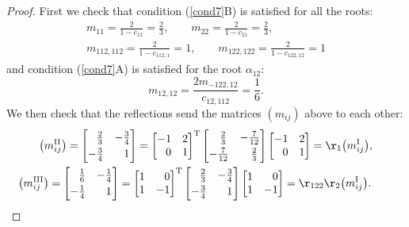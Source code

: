 \documentclass[pdftex]{sigma}%
\numberwithin{equation}{section}
\begin{document}
\begin{proof}
First we check that condition (\ref{cond7}B) is satisfied for all the roots:
\begin{gather*}
m_{11} = \frac{2}{1-c_{12}} = \frac{2}{3}, \qquad
m_{22} = \frac{2}{1-c_{21}} = \frac{2}{3}, \\
m_{112,112} = \frac{2}{1-c_{112,1}} = 1, \qquad
m_{122,122} = \frac{2}{1-c_{122,12}} = 1
\end{gather*}
and condition (\ref{cond7}A) is satisfied for the root $\alpha_{12}$:
\[m_{12,12} = \frac{2m_{-122,12}}{c_{12,112}} = \frac{1}{6}.\]
We then check that the reflections send the matrices $(m_{ij})$ above to each other:
\begin{gather*}
\big(m_{ij}^{\mathrm{II}}\big) =\begin{bmatrix}
 \hphantom{-}\frac{2}{3} & -\frac{3}{4}\vspace{1mm}\\
 -\frac{3}{4} & \hphantom{-}1
\end{bmatrix} =
\begin{bmatrix}
 -1 & 2\\
\hphantom{-}0 & 1
\end{bmatrix}^{\rm T}
\begin{bmatrix}
 \hphantom{-}\frac{2}{3} & -\frac{7}{12}\vspace{1mm}\\
 -\frac{7}{12} & \hphantom{-}\frac{2}{3}
\end{bmatrix}
\begin{bmatrix}
 -1 & 2\\
 \hphantom{-}0 & 1
\end{bmatrix} = \r_1 \big(m_{ij}^{\mathrm{I}}\big),\\
\big(m_{ij}^{\mathrm{III}}\big)=\begin{bmatrix}
 \hphantom{-}\frac{1}{6} & -\frac{1}{4}\vspace{1mm}\\
 -\frac{1}{4} & \hphantom{-}1
\end{bmatrix} =
\begin{bmatrix}
 1 & \hphantom{-}0\\
 1 & -1
\end{bmatrix}^{\rm T}
\begin{bmatrix}
\hphantom{-}\frac{2}{3} & -\frac{3}{4}\vspace{1mm}\\
 -\frac{3}{4} & \hphantom{-}1
\end{bmatrix}
\begin{bmatrix}
 1 & \hphantom{-}0\\
 1 & -1
\end{bmatrix} = \r_{122} \r_2 \big(m_{ij}^{\mathrm{I}}\big).\tag*{\qed}
\end{gather*}\renewcommand{\qed}{}
\end{proof}
\end{document}
